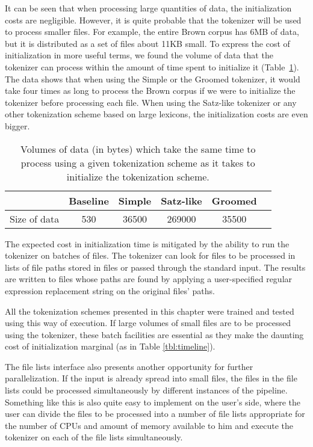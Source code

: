 It can be seen that when processing large quantities of data, the
initialization costs are negligible. However, it is quite probable that the
tokenizer will be used to process smaller files. For example, the entire Brown
corpus has 6MB of data, but it is distributed as a set of files about 11KB
small. To express the cost of initialization in more useful terms, we found the
volume of data that the tokenizer can process within the amount of time spent
to initialize it (Table~\ref{tbl:init-sizes}). The data shows that when using
the Simple or the Groomed tokenizer, it would take four times as long to
process the Brown corpus if we were to initialize the tokenizer before
processing each file. When using the Satz-like tokenizer or any other
tokenization scheme based on large lexicons, the initialization costs are even
bigger.

\begin{table}
  \begin{center}
    \begin{tabular}{ | l | c | c | c | c | c | }
      \hline
      & Baseline & Simple & Satz-like & Groomed \\ \hline
      Size of data & 530 & 36500 & 269000 & 35500 \\
      \hline
    \end{tabular}
  \end{center}
  \caption[Time spent initializing expressed as time spent processing data]
    {Volumes of data (in bytes) which take the same time to process using a
    given tokenization scheme as it takes to initialize the tokenization
    scheme.}
  \label{tbl:init-sizes}
\end{table}

The expected cost in initialization time is mitigated by the ability to run
the tokenizer on batches of files. The tokenizer can look for files to be
processed in lists of file paths stored in files or passed through the standard
input. The results are written to files whose paths are found by applying a
user-specified regular expression replacement string on the original files'
paths.

All the tokenization schemes presented in this chapter were trained and
tested using this way of execution. If large volumes of small files are to be
processed using the tokenizer, these batch facilities are essential as they
make the daunting cost of initialization marginal (as in Table
\ref{tbl:timeline}).

The file lists interface also presents another opportunity for further
parallelization. If the input is already spread into small files, the files in
the file lists could be processed simultaneously by different instances of the
pipeline. Something like this is also quite easy to implement on the user's
side, where the user can divide the files to be processed into a number of file
lists appropriate for the number of CPUs and amount of memory available to him
and execute the tokenizer on each of the file lists simultaneously.
